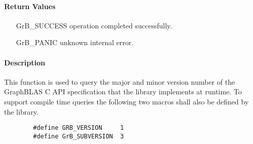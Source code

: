\paragraph{Return Values}

\begin{itemize}[leftmargin=2.1in]
\item[{\sf GrB\_SUCCESS}]        operation completed successfully.
\item[{\sf GrB\_PANIC}]          unknown internal error.
\end{itemize}

\paragraph{Description}

This function is used to query the major and minor version number of the
GraphBLAS C API specification that the library implements at runtime.  To
support compile time queries the following two macros shall also be defined by
the library.
\begin{verbatim}
        #define GRB_VERSION     1
        #define GrB_SUBVERSION  3
\end{verbatim}

